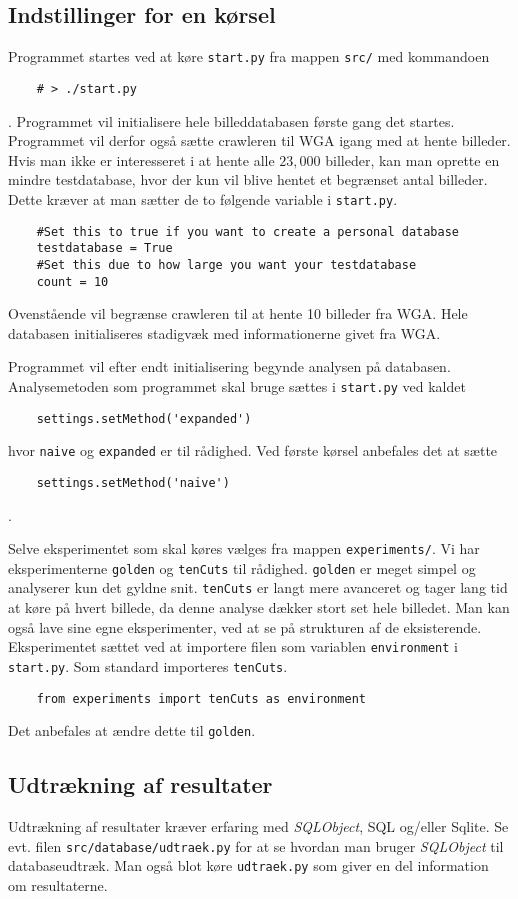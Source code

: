 {\subsection{Indstillinger for en kørsel}
Programmet startes ved at køre \texttt{start.py} fra mappen
\texttt{src/} med kommandoen
\begin{verbatim}
    # > ./start.py
\end{verbatim}.
Programmet vil initialisere hele billeddatabasen første gang det
startes. Programmet vil derfor også sætte crawleren til WGA igang med at
hente billeder. Hvis man ikke er interesseret i at hente alle $23,000$
billeder, kan man oprette en mindre testdatabase, hvor der kun vil blive
hentet et begrænset antal billeder. Dette kræver at man sætter de to
følgende variable i \texttt{start.py}.
\begin{verbatim}
    #Set this to true if you want to create a personal database
    testdatabase = True
    #Set this due to how large you want your testdatabase
    count = 10
\end{verbatim}
Ovenstående vil begrænse crawleren til at hente 10 billeder fra WGA.
Hele databasen initialiseres stadigvæk med informationerne givet fra
WGA.

Programmet vil efter endt initialisering begynde analysen på databasen.
Analysemetoden som programmet skal bruge sættes i \texttt{start.py} ved
kaldet
\begin{verbatim}
    settings.setMethod('expanded')
\end{verbatim}
hvor \texttt{naive} og \texttt{expanded} er til rådighed. Ved første
kørsel anbefales det at sætte
\begin{verbatim}
    settings.setMethod('naive')
\end{verbatim}.

Selve eksperimentet som skal køres vælges fra mappen
\texttt{experiments/}. Vi har eksperimenterne \texttt{golden} og
\texttt{tenCuts} til rådighed.  \texttt{golden} er meget simpel og
analyserer kun det gyldne snit.  \texttt{tenCuts} er langt mere
avanceret og tager lang tid at køre på hvert billede, da denne analyse
dækker stort set hele billedet. Man kan også lave sine egne
eksperimenter, ved at se på strukturen af de eksisterende. Eksperimentet
sættet ved at importere filen som variablen \texttt{environment} i
\texttt{start.py}. Som standard importeres \texttt{tenCuts}.
\begin{verbatim}
    from experiments import tenCuts as environment
\end{verbatim}
Det anbefales at ændre dette til \texttt{golden}.

\subsection{Udtrækning af resultater}
Udtrækning af resultater kræver erfaring med \emph{SQLObject}, SQL
og/eller Sqlite. Se evt. filen \texttt{src/database/udtraek.py} for
at se hvordan man bruger \emph{SQLObject} til databaseudtræk. Man også
blot køre \texttt{udtraek.py} som giver en del information om
resultaterne.

}

